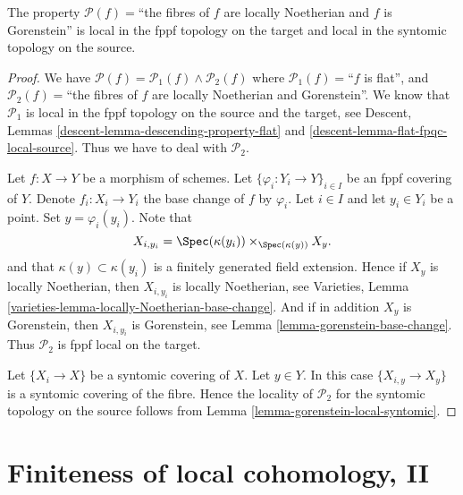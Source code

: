 \begin{lemma}
\label{lemma-gorenstein-local-source-and-target}
The property
$\mathcal{P}(f)=$``the fibres of $f$ are locally Noetherian and $f$ is
Gorenstein'' is local in the fppf topology on the target and
local in the syntomic topology on the source.
\end{lemma}

\begin{proof}
We have
$\mathcal{P}(f) =
\mathcal{P}_1(f) \wedge \mathcal{P}_2(f)$
where
$\mathcal{P}_1(f)=$``$f$ is flat'', and
$\mathcal{P}_2(f)=$``the fibres of $f$ are locally Noetherian
and Gorenstein''.
We know that $\mathcal{P}_1$ is
local in the fppf topology on the source and the target, see
Descent, Lemmas \ref{descent-lemma-descending-property-flat} and
\ref{descent-lemma-flat-fpqc-local-source}. Thus we have to deal
with $\mathcal{P}_2$.

\medskip\noindent
Let $f : X \to Y$ be a morphism of schemes.
Let $\{\varphi_i : Y_i \to Y\}_{i \in I}$ be an fppf covering of $Y$.
Denote $f_i : X_i \to Y_i$ the base change of $f$ by $\varphi_i$.
Let $i \in I$ and let $y_i \in Y_i$ be a point.
Set $y = \varphi_i(y_i)$. Note that
$$
X_{i, y_i} = \Spec(\kappa(y_i)) \times_{\Spec(\kappa(y))} X_y.
$$
and that $\kappa(y) \subset \kappa(y_i)$ is a finitely generated field
extension. Hence if $X_y$ is locally Noetherian, then
$X_{i, y_i}$ is locally Noetherian, see
Varieties, Lemma \ref{varieties-lemma-locally-Noetherian-base-change}.
And if in addition $X_y$ is Gorenstein,
then $X_{i, y_i}$ is Gorenstein, see
Lemma \ref{lemma-gorenstein-base-change}.
Thus $\mathcal{P}_2$ is fppf local on the target.

\medskip\noindent
Let $\{X_i \to X\}$ be a syntomic covering of $X$.
Let $y \in Y$. In this case $\{X_{i, y} \to X_y\}$ is a
syntomic covering of the fibre. Hence the locality of $\mathcal{P}_2$
for the syntomic topology on the source follows from
Lemma \ref{lemma-gorenstein-local-syntomic}.
\end{proof}










\section{Finiteness of local cohomology, II}
\label{section-finiteness-II}

